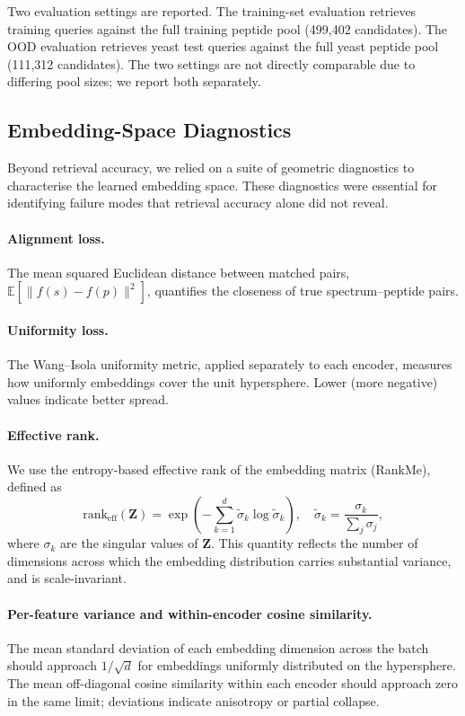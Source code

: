 \documentclass[pdflatex,sn-mathphys-num]{sn-jnl}%
\theoremstyle{thmstyleone}%
\theoremstyle{thmstyletwo}%
\theoremstyle{thmstylethree}%
\begin{document}
Two evaluation settings are reported. The training-set evaluation retrieves training queries against the full training peptide pool (499{,}402 candidates). The OOD evaluation retrieves yeast test queries against the full yeast peptide pool (111{,}312 candidates). The two settings are not directly comparable due to differing pool sizes; we report both separately.

\subsection{Embedding-Space Diagnostics}
\label{subsec:diagnostics}

Beyond retrieval accuracy, we relied on a suite of geometric diagnostics to characterise the learned embedding space. These diagnostics were essential for identifying failure modes that retrieval accuracy alone did not reveal.

\paragraph{Alignment loss.} The mean squared Euclidean distance between matched pairs, $\mathbb{E}[\|f(s)-f(p)\|^2]$, quantifies the closeness of true spectrum--peptide pairs.

\paragraph{Uniformity loss.} The Wang--Isola uniformity metric, applied separately to each encoder, measures how uniformly embeddings cover the unit hypersphere. Lower (more negative) values indicate better spread.

\paragraph{Effective rank.} We use the entropy-based effective rank of the embedding matrix (RankMe), defined as
\begin{equation}
\mathrm{rank}_\text{eff}(\mathbf{Z}) = \exp\left(-\sum_{k=1}^{d} \tilde{\sigma}_k \log \tilde{\sigma}_k\right), \quad \tilde{\sigma}_k = \frac{\sigma_k}{\sum_j \sigma_j},
\end{equation}
where $\sigma_k$ are the singular values of $\mathbf{Z}$. This quantity reflects the number of dimensions across which the embedding distribution carries substantial variance, and is scale-invariant.

\paragraph{Per-feature variance and within-encoder cosine similarity.} The mean standard deviation of each embedding dimension across the batch should approach $1/\sqrt{d}$ for embeddings uniformly distributed on the hypersphere. The mean off-diagonal cosine similarity within each encoder should approach zero in the same limit; deviations indicate anisotropy or partial collapse.
\end{document}
